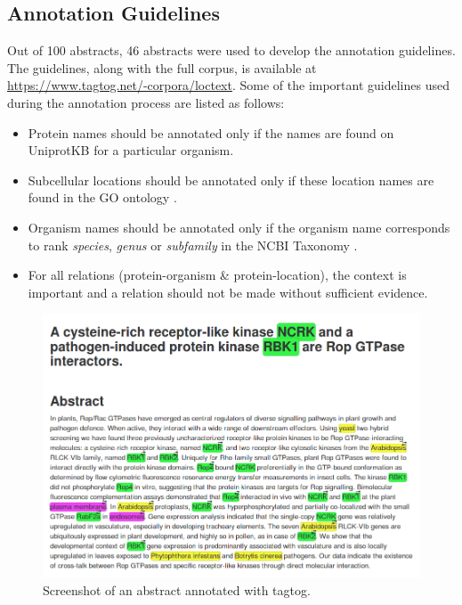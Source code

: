 \subsection*{Annotation Guidelines}

Out of 100 abstracts, 46 abstracts were used to develop the annotation guidelines. The guidelines, along with the full corpus, is available at \url{https://www.tagtog.net/-corpora/loctext}. Some of the important guidelines used during the annotation process are listed as follows:

\begin{itemize}

\item Protein names should be annotated only if the names are found on UniprotKB \cite{magrane2011uniprot} for a particular organism.

\item Subcellular locations should be annotated only if these location names are found in the GO ontology \cite{ashburner2000gene}.

\item Organism names should be annotated only if the organism name corresponds to rank \textit{species}, \textit{genus} or \textit{subfamily} in the NCBI Taxonomy \cite{ncbiTaxonomy}.

\item For all relations (protein-organism \& protein-location), the context is important and a relation should not be made without sufficient evidence.

\end{itemize}


\begin{figure}
\centering
\includegraphics[scale=0.4]{figures/tagtog_screenshot.png}
\caption{Screenshot of an abstract annotated with tagtog.}\label{fig:tagtogScreenshot}
\end{figure}

